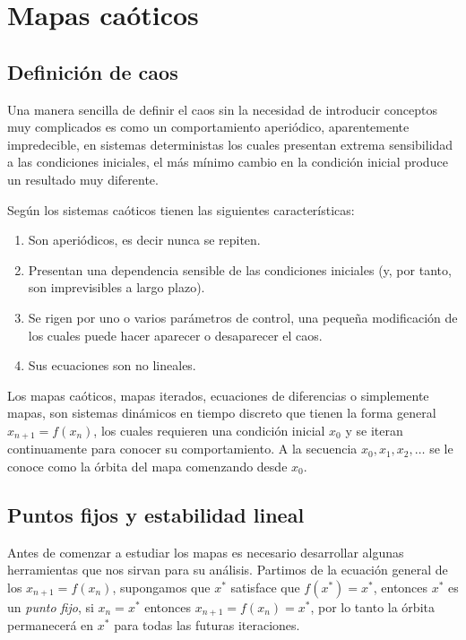 \chapter{Mapas caóticos}

    \section{Definición de caos}
    
        Una manera sencilla de definir el caos sin la necesidad de introducir conceptos muy complicados es como un comportamiento aperiódico, aparentemente impredecible, en sistemas deterministas los cuales presentan extrema sensibilidad a las condiciones iniciales, el más mínimo cambio en la condición inicial produce un resultado muy diferente. \cite{Strogatz1994}

        Según \cite{Sprott2003} los sistemas caóticos tienen las siguientes características:

        \begin{enumerate}
            \item Son aperiódicos, es decir nunca se repiten.
            \item Presentan una dependencia sensible de las condiciones iniciales (y, por tanto, son imprevisibles a largo plazo).
            \item Se rigen por uno o varios parámetros de control, una pequeña modificación de los cuales puede hacer aparecer o desaparecer el caos.
            \item Sus ecuaciones son no lineales.
        \end{enumerate}

        Los mapas caóticos, mapas iterados, ecuaciones de diferencias o simplemente mapas, son sistemas dinámicos en tiempo discreto que tienen la forma general $x_{n+1} = f(x_{n})$, los cuales requieren una condición inicial $x_{0}$ y se iteran continuamente para conocer su comportamiento. A la secuencia $x_{0}, x_{1}, x_{2} , \ldots $ se le conoce como la órbita del mapa comenzando desde $x_{0}$.

    \section{Puntos fijos y estabilidad lineal}

        Antes de comenzar a estudiar los mapas es necesario desarrollar algunas herramientas que nos sirvan para su análisis. Partimos de la ecuación general de los  $x_{n+1} = f(x_{n})$, supongamos que $x^{*}$ satisface que $f(x^{*}) = x^{*} $, entonces $x^{*}$ es un \emph{punto fijo}, si $x_{n} = x^{*} $ entonces $x_{n+1} = f(x_{n}) = x^{*} $, por lo tanto la órbita permanecerá en $x^{*} $ para todas las futuras iteraciones. 

